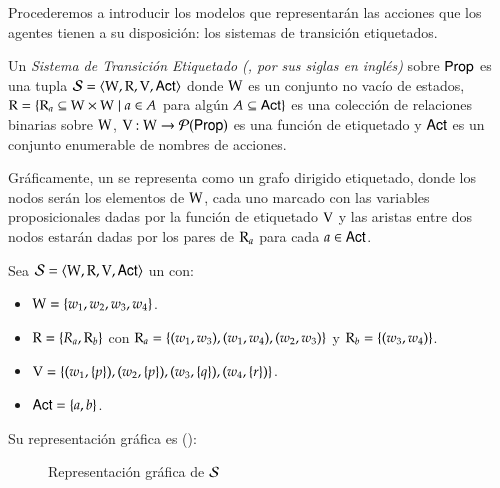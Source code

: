 Procederemos a introducir los modelos que representarán las acciones que los agentes tienen a su disposición: 
los sistemas de transición etiquetados.

\begin{definicion}
    Un \emph{Sistema de Transición Etiquetado (\lts, por sus siglas en inglés)} sobre ${\rm \sf Prop}$ es una tupla $\mathcal{S} = \langle \mathrm{W}, \mathrm{R}, \mathrm{V}, {\rm \sf Act} \rangle$ 
    donde $\mathrm{W}$ es un conjunto no vacío de estados, $\mathrm{R} = \{\mathrm{R}_a \subseteq \mathrm{W} \times \mathrm{W} \mid a \in A$ para algún $A \subseteq {\rm \sf Act}\}$ es 
    una colección de relaciones binarias sobre $\mathrm{W}$, $\mathrm{V} : \mathrm{W} \to \mathcal{P}({\rm \sf Prop})$ es una función de etiquetado y ${\rm \sf Act}$ es un 
    conjunto enumerable de nombres de acciones.
\end{definicion}

Gráficamente, un \lts se representa como un grafo dirigido etiquetado, donde los nodos serán los elementos de $\mathrm{W}$, cada uno marcado con las variables proposicionales 
dadas por la función de etiquetado $\mathrm{V}$ y las aristas entre dos nodos estarán dadas por los pares de $\mathrm{R}_a$ para cada $a \in {\rm \sf Act}$.

\begin{ejemplo}\label{ejemplo:lts}
    Sea $\mathcal{S} = \langle \mathrm{W}, \mathrm{R}, \mathrm{V}, {\rm \sf Act} \rangle$ un \lts con:
    
    \begin{itemize}
        \item $\mathrm{W} = \{w_1, w_2, w_3, w_4\}$.
        \item $\mathrm{R} = \{R_a, \mathrm{R}_b\}$ con $\mathrm{R}_a = \{(w_1,w_3), (w_1,w_4), (w_2,w_3)\}$ y $\mathrm{R}_b = \{(w_3,w_4)\}$.
        \item $\mathrm{V} = \{(w_1, \{p\}), (w_2, \{p\}), (w_3, \{q\}), (w_4, \{r\})\}$.
        \item ${\rm \sf Act} = \{a, b\}$.
    \end{itemize}

    Su representación gráfica es ():
    \begin{figure}[h]
        \centering
        \caption{Representación gráfica de $\mathcal{S}$}
        \label{fig:lts}
    \end{figure}

\end{ejemplo}

